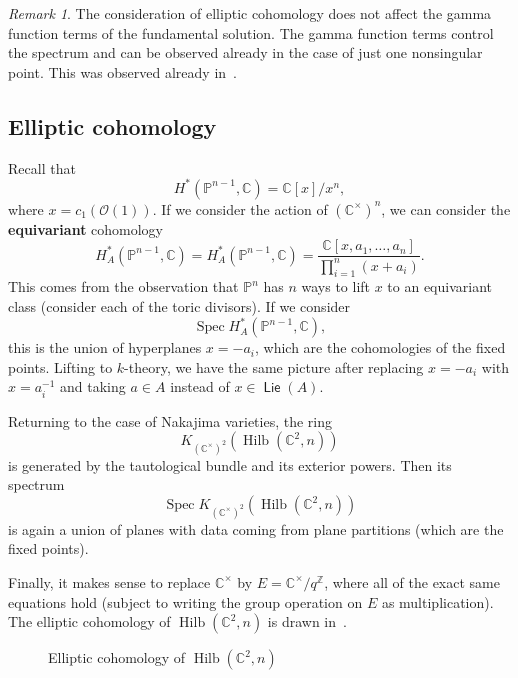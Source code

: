 \documentclass[leqno, openany]{memoir}
\theoremstyle{definition}
\theoremstyle{remark}
\newtheorem{rmk}[thm]{Remark}
\theoremstyle{plain}
\theoremstyle{definition}
\theoremstyle{remark}
\newcommand{\C}{\mathbb{C}}
\newcommand{\Z}{\mathbb{Z}}
\renewcommand{\P}{\mathbb{P}}
\newcommand{\mc}[1]{\mathcal{#1}}
\newcommand{\ms}[1]{\mathsf{#1}}
\newcommand{\on}[1]{\operatorname{#1}}
\DeclareMathOperator{\Spec}{Spec}
\DeclareMathOperator{\Hilb}{Hilb}
\begin{document}
\begin{rmk}
    The consideration of elliptic cohomology does not affect the gamma function terms of the fundamental solution. The gamma function terms control the spectrum and can be observed already in the case of just one nonsingular point. This was observed already in~\cite{nekshat}.
\end{rmk}

\subsection{Elliptic cohomology}

Recall that
\[ H^*(\P^{n-1}, \C) = \C[x]/x^{n}, \]
where $x = c_1(\mc{O}(1))$. If we consider the action of $(\C^{\times})^n$, we can consider the \textbf{equivariant} cohomology 
\[ H_A^*(\P^{n-1}, \C) = H_A^*(\P^{n-1}, \C) = \frac{\C[x, a_1, \ldots, a_n]}{\prod_{i=1}^n (x+a_i)}. \]
This comes from the observation that $\P^n$ has $n$ ways to lift $x$ to an equivariant class (consider each of the toric divisors). If we consider
\[ \Spec H_A^*(\P^{n-1}, \C), \]
this is the union of hyperplanes $x = -a_i$, which are the cohomologies of the fixed points. Lifting to $k$-theory, we have the same picture after replacing $x=-a_i$ with $x=a_i^{-1}$ and taking $a \in A$ instead of $x \in \on{\ms{Lie}}(A)$.

Returning to the case of Nakajima varieties, the ring 
\[ K_{(\C^{\times})^2} (\Hilb(\C^2, n)) \]
is generated by the tautological bundle and its exterior powers. Then its spectrum
\[ \Spec K_{(\C^{\times})^2}(\Hilb(\C^2, n)) \]
is again a union of planes with data coming from plane partitions (which are the fixed points).

Finally, it makes sense to replace $\C^{\times}$ by $E = \C^{\times}/q^{\Z}$, where all of the exact same equations hold (subject to writing the group operation on $E$ as multiplication). The elliptic cohomology of $\Hilb(\C^2, n)$ is drawn in~.
\begin{figure}[h]
    \centering
    \caption{Elliptic cohomology of $\Hilb(\C^2, n)$}
    \label{fig:ellhilbc2}
\end{figure}
\end{document}
